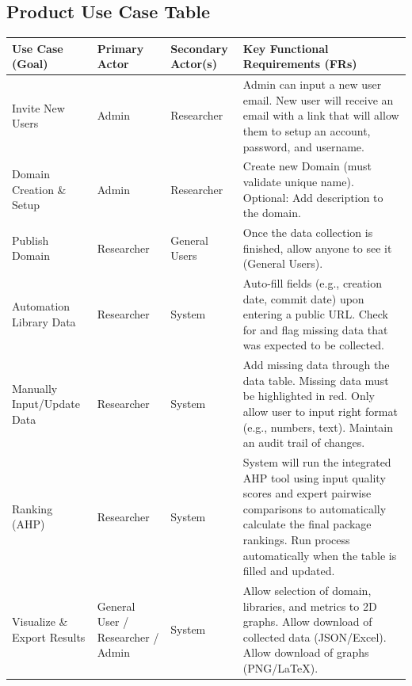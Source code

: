 \documentclass[12pt]{article}
\begin{document}
\subsection{Product Use Case Table}
\begin{tabularx}{\textwidth}{|p{2cm}|p{2cm}|p{2cm}|X|} \hline
\toprule
\textbf{Use Case (Goal)} & \textbf{Primary Actor} & \textbf{Secondary Actor(s)} & \textbf{Key Functional Requirements (FRs)} \\ \hline
\midrule
Invite New Users & Admin & Researcher & Admin can input a new user email. New user will receive an email with a link that will allow them to setup an account, password, and username. \\  \hline
Domain Creation \& Setup & Admin & Researcher & Create new Domain (must validate unique name). Optional: Add description to the domain. \\  \hline
Publish Domain & Researcher & General Users & Once the data collection is finished, allow anyone to see it (General Users). \\  \hline
Automation Library Data & Researcher & System & Auto-fill fields (e.g., creation date, commit date) upon entering a public URL. Check for and flag missing data that was expected to be collected. \\  \hline
Manually Input/Update Data & Researcher & System & Add missing data through the data table. Missing data must be highlighted in red. Only allow user to input right format (e.g., numbers, text). Maintain an audit trail of changes. \\  \hline
Ranking (AHP) & Researcher & System & System will run the integrated AHP tool using input quality scores and expert pairwise comparisons to automatically calculate the final package rankings. Run process automatically when the table is filled and updated. \\  \hline
Visualize \& Export Results & General User / Researcher / Admin & System & Allow selection of domain, libraries, and metrics to 2D graphs. Allow download of collected data (JSON/Excel). Allow download of graphs (PNG/LaTeX). \\  \hline
\bottomrule
\end{tabularx}
\end{document}
